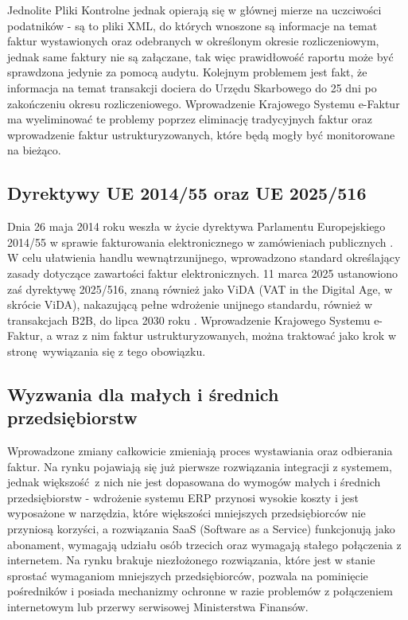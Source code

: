 Jednolite Pliki Kontrolne jednak opierają się w głównej mierze na uczciwości podatników - są to pliki XML, do których wnoszone są informacje na temat faktur wystawionych oraz odebranych w określonym okresie rozliczeniowym, jednak same faktury nie są załączane, tak więc prawidłowość raportu może być sprawdzona jedynie za pomocą audytu. Kolejnym problemem jest fakt, że informacja na temat transakcji dociera do Urzędu Skarbowego do 25 dni \parencite{zebrowska-fresenbet_jpk_2021} po zakończeniu okresu rozliczeniowego. Wprowadzenie Krajowego Systemu e-Faktur ma wyeliminować te problemy poprzez eliminację tradycyjnych faktur oraz wprowadzenie faktur ustrukturyzowanych, które będą mogły być monitorowane na bieżąco. 

\subsection{Dyrektywy UE 2014/55 oraz UE 2025/516}
Dnia 26 maja 2014 roku weszła w życie dyrektywa Parlamentu Europejskiego 2014/55 w sprawie fakturowania elektronicznego w zamówieniach publicznych \parencite{european_directive_2014}. W celu ułatwienia handlu wewnątrzunijnego, wprowadzono standard określający zasady dotyczące zawartości faktur elektronicznych. 11 marca 2025 ustanowiono zaś dyrektywę 2025/516, znaną również jako ViDA (VAT in the Digital Age, w skrócie ViDA), nakazującą pełne wdrożenie unijnego standardu, również w transakcjach B2B, do lipca 2030 roku \parencite{vida_council_2025}. Wprowadzenie Krajowego Systemu e-Faktur, a wraz z nim faktur ustrukturyzowanych, można traktować jako krok w stronę wywiązania się z tego obowiązku.

\subsection{Wyzwania dla małych i średnich przedsiębiorstw}
Wprowadzone zmiany całkowicie zmieniają proces wystawiania oraz odbierania faktur. Na rynku pojawiają się już pierwsze rozwiązania integracji z systemem, jednak większość z nich nie jest dopasowana do wymogów małych i średnich przedsiębiorstw - wdrożenie systemu ERP przynosi wysokie koszty i jest wyposażone w narzędzia, które większości mniejszych przedsiębiorców nie przyniosą korzyści, a rozwiązania SaaS (Software as a Service) funkcjonują jako abonament, wymagają udziału osób trzecich oraz wymagają stałego połączenia z internetem. Na rynku brakuje niezłożonego rozwiązania, które jest w stanie sprostać wymaganiom mniejszych przedsiębiorców, pozwala na pominięcie pośredników i posiada mechanizmy ochronne w razie problemów z połączeniem internetowym lub przerwy serwisowej Ministerstwa Finansów.

